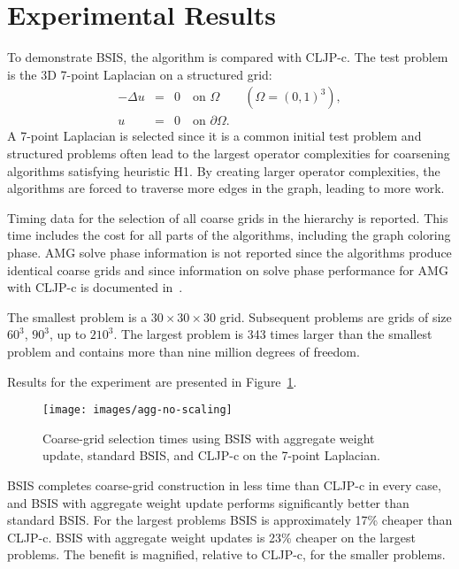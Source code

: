 \documentclass{elsart}
\begin{document}
\section{Experimental Results}
\label{5:sec:experiments}
To demonstrate BSIS, the algorithm is compared with CLJP-c. The test
problem is the 3D 7-point Laplacian on a structured grid:
\begin{eqnarray}
\label{5:eqn:Lap} -\Delta u & = & 0 \quad \textrm{on } \Omega \qquad
(\Omega = (0, 1)^3),\\
\nonumber u & = & 0 \quad \textrm{on } \partial \Omega.
\end{eqnarray}
A 7-point Laplacian is selected since it is a common initial test
problem and structured problems often lead to the largest operator
complexities for coarsening algorithms satisfying heuristic H1. By
creating larger operator complexities, the algorithms are forced to
traverse more edges in the graph, leading to more work.

Timing data for the selection of all coarse grids in the hierarchy is
reported. This time includes the cost for all parts of the algorithms,
including the graph coloring phase. AMG solve phase information is not
reported since the algorithms produce identical coarse grids and since
information on solve phase performance for AMG with CLJP-c is
documented in~\cite{alber-cljpc, alber-PCGS}.

The smallest problem is a $30 \times 30 \times 30$ grid. Subsequent
problems are grids of size $60^3$, $90^3$, up to $210^3$. The largest
problem is 343 times larger than the smallest problem and contains
more than nine million degrees of freedom.

Results for the experiment are presented in
Figure~\ref{5:fig:results-full}.
\begin{figure}
  \begin{center}
    \texttt{[image: images/agg-no-scaling]}
    \caption{Coarse-grid selection times using BSIS with aggregate
    weight update, standard BSIS, and CLJP-c on the 7-point
    Laplacian.}
    \label{5:fig:results-full}
  \end{center}
\end{figure}
BSIS completes coarse-grid construction in less time than CLJP-c in
every case, and BSIS with aggregate weight update performs
significantly better than standard BSIS. For the largest problems BSIS
is approximately 17\% cheaper than CLJP-c. BSIS with aggregate weight
updates is 23\% cheaper on the largest problems. The benefit is
magnified, relative to CLJP-c, for the smaller problems.
\end{document}
